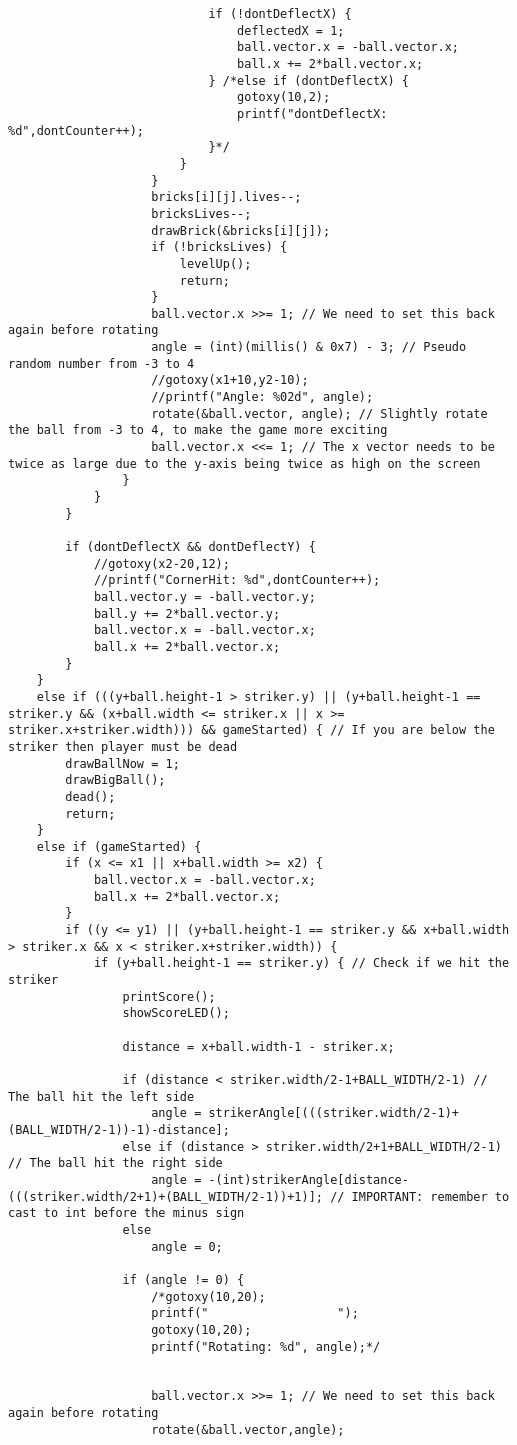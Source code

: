 \begin{lstlisting}
							if (!dontDeflectX) {
								deflectedX = 1;
								ball.vector.x = -ball.vector.x;
								ball.x += 2*ball.vector.x;
							} /*else if (dontDeflectX) {
								gotoxy(10,2);
								printf("dontDeflectX: %d",dontCounter++);
							}*/
						}						
					}
					bricks[i][j].lives--;
					bricksLives--;				
					drawBrick(&bricks[i][j]);
					if (!bricksLives) {
						levelUp();
						return;
					}
					ball.vector.x >>= 1; // We need to set this back again before rotating
					angle = (int)(millis() & 0x7) - 3; // Pseudo random number from -3 to 4
					//gotoxy(x1+10,y2-10);
					//printf("Angle: %02d", angle);
					rotate(&ball.vector, angle); // Slightly rotate the ball from -3 to 4, to make the game more exciting
					ball.vector.x <<= 1; // The x vector needs to be twice as large due to the y-axis being twice as high on the screen
				}			
			}
		}
	
		if (dontDeflectX && dontDeflectY) {
			//gotoxy(x2-20,12);
			//printf("CornerHit: %d",dontCounter++);
			ball.vector.y = -ball.vector.y;
			ball.y += 2*ball.vector.y;
			ball.vector.x = -ball.vector.x;
			ball.x += 2*ball.vector.x;
		}
	}
	else if (((y+ball.height-1 > striker.y) || (y+ball.height-1 == striker.y && (x+ball.width <= striker.x || x >= striker.x+striker.width))) && gameStarted) { // If you are below the striker then player must be dead	
		drawBallNow = 1;
		drawBigBall();
		dead();
		return;
	}
	else if (gameStarted) {
		if (x <= x1 || x+ball.width >= x2) {
			ball.vector.x = -ball.vector.x;
			ball.x += 2*ball.vector.x;
		}		
		if ((y <= y1) || (y+ball.height-1 == striker.y && x+ball.width > striker.x && x < striker.x+striker.width)) {
			if (y+ball.height-1 == striker.y) { // Check if we hit the striker
				printScore();
				showScoreLED();
	
				distance = x+ball.width-1 - striker.x;

				if (distance < striker.width/2-1+BALL_WIDTH/2-1) // The ball hit the left side
					angle = strikerAngle[(((striker.width/2-1)+(BALL_WIDTH/2-1))-1)-distance];
				else if (distance > striker.width/2+1+BALL_WIDTH/2-1) // The ball hit the right side
				 	angle = -(int)strikerAngle[distance-(((striker.width/2+1)+(BALL_WIDTH/2-1))+1)]; // IMPORTANT: remember to cast to int before the minus sign
				else
					angle = 0;

				if (angle != 0) {
					/*gotoxy(10,20);
					printf("                  ");
					gotoxy(10,20);
					printf("Rotating: %d", angle);*/


					ball.vector.x >>= 1; // We need to set this back again before rotating
					rotate(&ball.vector,angle);


\end{lstlisting}

